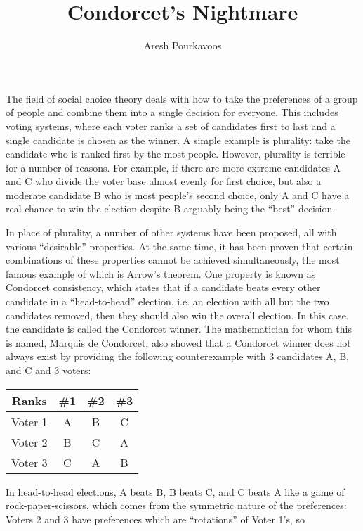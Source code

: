 \documentclass{article}
\begin{document}
\title{Condorcet's Nightmare}
\author{Aresh Pourkavoos}
\maketitle

The field of social choice theory deals with
how to take the preferences of a group of people
and combine them into a single decision for everyone.
This includes voting systems,
where each voter ranks a set of candidates first to last
and a single candidate is chosen as the winner.
A simple example is plurality:
take the candidate who is ranked first by the most people.
However, plurality is terrible for a number of reasons.
For example, if there are more extreme candidates A and C
who divide the voter base almost evenly for first choice,
but also a moderate candidate B who is most people's second choice,
only A and C have a real chance to win the election
despite B arguably being the ``best'' decision.

In place of plurality, a number of other systems have been proposed,
all with various ``desirable'' properties.
At the same time, it has been proven that
certain combinations of these properties cannot be achieved simultaneously,
the most famous example of which is Arrow's theorem.
One property is known as Condorcet consistency,
which states that if a candidate beats every other candidate in a ``head-to-head'' election,
i.e. an election with all but the two candidates removed,
then they should also win the overall election.
In this case, the candidate is called the Condorcet winner.
The mathematician for whom this is named, Marquis de Condorcet,
also showed that a Condorcet winner does not always exist
by providing the following counterexample
with 3 candidates A, B, and C and 3 voters:

\begin{center}
  \begin{tabular}{|c|c c c|}
    \hline
    Ranks & \#1 & \#2 & \#3 \\ \hline
    Voter 1 & A & B & C \\ \hline
    Voter 2 & B & C & A \\ \hline
    Voter 3 & C & A & B \\ \hline
  \end{tabular}
\end{center}

In head-to-head elections,
A beats B, B beats C, and C beats A
like a game of rock-paper-scissors,
which comes from the symmetric nature of the preferences:
Voters 2 and 3 have preferences which are ``rotations'' of Voter 1's,
so
\end{document}

